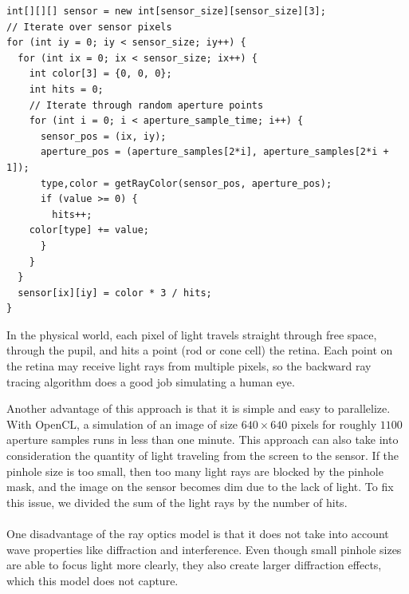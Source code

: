 \begin{lstlisting}[frame=single, basicstyle=\footnotesize\ttfamily, caption=Pseudocode For Ray Optics Simulation]
int[][][] sensor = new int[sensor_size][sensor_size][3];
// Iterate over sensor pixels
for (int iy = 0; iy < sensor_size; iy++) {
  for (int ix = 0; ix < sensor_size; ix++) {
    int color[3] = {0, 0, 0};
    int hits = 0;
    // Iterate through random aperture points
    for (int i = 0; i < aperture_sample_time; i++) {
      sensor_pos = (ix, iy);
      aperture_pos = (aperture_samples[2*i], aperture_samples[2*i + 1]);
      type,color = getRayColor(sensor_pos, aperture_pos);
      if (value >= 0) {
        hits++;
	color[type] += value;
      }
    }
  }
  sensor[ix][iy] = color * 3 / hits;
}
\end{lstlisting}

In the physical world, each pixel of light travels straight through free space, through the pupil, and hits a point (rod or cone cell) the retina. Each point on the retina may receive light rays from multiple pixels, so the backward ray tracing algorithm does a good job simulating a human eye. 

Another advantage of this approach is that it is simple and easy to parallelize. With OpenCL, a simulation of an image of size $640\times640$ pixels for roughly $1100$ aperture samples runs in less than one minute. This approach can also take into consideration the quantity of light traveling from the screen to the sensor. If the pinhole size is too small, then too many light rays are blocked by the pinhole mask, and the image on the sensor becomes dim due to the lack of light. To fix this issue, we divided the sum of the light rays by the number of hits. \\
\\
One disadvantage of the ray optics model is that it does not take into account wave properties like diffraction and interference. Even though small pinhole sizes are able to focus light more clearly, they also create larger diffraction effects, which this model does not capture. 